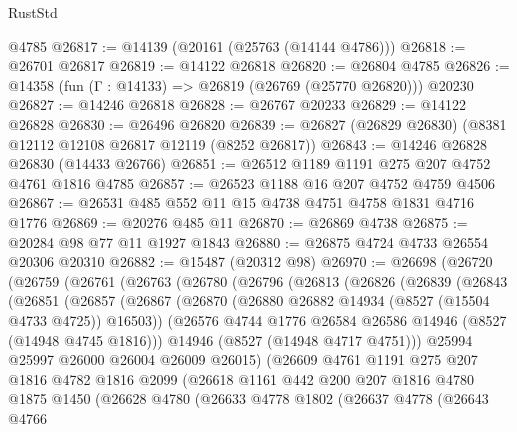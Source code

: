 \begin{lexlean}{RustStd}
\begin{coremodule}
    @4785
@26817 := @14139 (@20161 (@25763 (@14144 @4786)))
@26818 := @26701 @26817
@26819 := @14122 @26818
@26820 := @26804 @4785
@26826 := @14358 (fun (Γ : @14133) => @26819 (@26769 (@25770 @26820))) @20230
@26827 := @14246 @26818
@26828 := @26767 @20233
@26829 := @14122 @26828
@26830 := @26496 @26820
@26839 := @26827 (@26829 @26830) (@8381 @12112 @12108 @26817 @12119 (@8252 @26817))
@26843 := @14246 @26828 @26830 (@14433 @26766)
@26851 := @26512 @1189 @1191 @275 @207 @4752 @4761 @1816 @4785
@26857 := @26523 @1188 @16 @207 @4752 @4759 @4506
@26867 := @26531 @485 @552 @11 @15 @4738 @4751 @4758 @1831 @4716 @1776
@26869 := @20276 @485 @11
@26870 := @26869 @4738
@26875 := @20284 @98 @77 @11 @1927 @1843
@26880 := @26875 @4724 @4733 @26554 @20306 @20310
@26882 := @15487 (@20312 @98)
@26970 := @26698
    (@26720
      (@26759
        (@26761
          (@26763
            (@26780
              (@26796
                (@26813
                  (@26826
                    (@26839
                      (@26843
                        (@26851
                          (@26857
                            (@26867
                              (@26870 (@26880 @26882 @14934 (@8527 (@15504 @4733 @4725)) @16503))
                              (@26576 @4744 @1776 @26584 @26586 @14946 (@8527 (@14948 @4745 @1816)))
                              @14946
                              (@8527 (@14948 @4717 @4751)))
                            @25994
                            @25997
                            @26000
                            @26004
                            @26009
                            @26015)
                          (@26609
                            @4761
                            @1191
                            @275
                            @207
                            @1816
                            @4782
                            @1816
                            @2099
                            (@26618
                              @1161
                              @442
                              @200
                              @207
                              @1816
                              @4780
                              @1875
                              @1450
                              (@26628
                                @4780
                                (@26633
                                  @4778
                                  @1802
                                  (@26637
                                    @4778
                                    (@26643
                                      @4766

\end{coremodule}
\end{lexlean}
